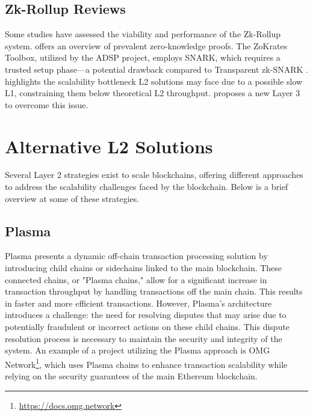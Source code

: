 \subsection{Zk-Rollup Reviews}
Some studies have assessed the viability and performance of the Zk-Rollup system. \cite{capko_state_2022} offers an overview of prevalent zero-knowledge proofs. The ZoKrates Toolbox, utilized by the ADSP project, employs SNARK, which requires a trusted setup phase—a potential drawback compared to Transparent zk-SNARK \cite{zhou_overview_2022}. \cite{neiheiser_practical_2023} highlights the scalability bottleneck L2 solutions may face due to a possible slow L1, constraining them below theoretical L2 throughput. \cite{starkware_fractal_2021} proposes a new Layer 3 to overcome this issue.

\section{Alternative L2 Solutions}
Several Layer 2 strategies exist to scale blockchains, offering different approaches to address the scalability challenges faced by the blockchain. Below is a brief overview at some of these strategies.

\subsection{Plasma}
Plasma presents a dynamic off-chain transaction processing solution by introducing child chains or sidechains linked to the main blockchain. These connected chains, or "Plasma chains," allow for a significant increase in transaction throughput by handling transactions off the main chain. This results in faster and more efficient transactions. However, Plasma's architecture introduces a challenge: the need for resolving disputes that may arise due to potentially fraudulent or incorrect actions on these child chains\cite{thibault_blockchain_2022}. This dispute resolution process is necessary to maintain the security and integrity of the system. An example of a project utilizing the Plasma approach is OMG Network\footnote{\url{https://docs.omg.network}}, which uses Plasma chains to enhance transaction scalability while relying on the security guarantees of the main Ethereum blockchain.

